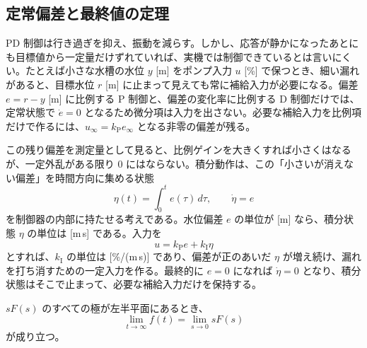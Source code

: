 \subsection{定常偏差と最終値の定理}

PD 制御は行き過ぎを抑え、振動を減らす。しかし、応答が静かになったあとにも目標値から一定量だけずれていれば、実機では制御できているとは言いにくい。たとえば小さな水槽の水位 $y$ [m] をポンプ入力 $u$ [\%] で保つとき、細い漏れがあると、目標水位 $r$ [m] に止まって見えても常に補給入力が必要になる。偏差 $e=r-y$ [m] に比例する P 制御と、偏差の変化率に比例する D 制御だけでは、定常状態で $\dot{e}=0$ となるため微分項は入力を出さない。必要な補給入力を比例項だけで作るには、$u_\infty=k_\mathrm{P}e_\infty$ となる非零の偏差が残る。

この残り偏差を測定量として見ると、比例ゲインを大きくすれば小さくはなるが、一定外乱がある限り 0 にはならない。積分動作は、この「小さいが消えない偏差」を時間方向に集める状態
\begin{equation}
  \eta(t)=\int_0^t e(\tau)\,d\tau,
  \qquad
  \dot{\eta}=e
\end{equation}
を制御器の内部に持たせる考えである。水位偏差 $e$ の単位が [m] なら、積分状態 $\eta$ の単位は [m\,s] である。入力を
\begin{equation}
  u=k_\mathrm{P}e+k_\mathrm{I}\eta
\end{equation}
とすれば、$k_\mathrm{I}$ の単位は [\%/(m\,s)] であり、偏差が正のあいだ $\eta$ が増え続け、漏れを打ち消すための一定入力を作る。最終的に $e=0$ になれば $\dot{\eta}=0$ となり、積分状態はそこで止まって、必要な補給入力だけを保持する。

\begin{theorem}[最終値の定理]
$sF(s)$ のすべての極が左半平面にあるとき、
\begin{equation}
  \lim_{t\to\infty}f(t)=\lim_{s\to0}sF(s)
\end{equation}
が成り立つ。
\end{theorem}

